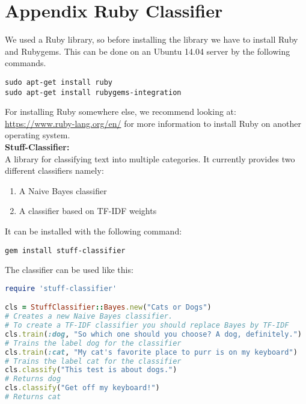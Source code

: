 \section{Appendix Ruby Classifier} \label{app:classifier}

We used a Ruby library, so before installing the library we have to install Ruby and Rubygems.
This can be done on an Ubuntu 14.04 server by the following commands. 
\begin{lstlisting}[frame=single]
sudo apt-get install ruby
sudo apt-get install rubygems-integration
\end{lstlisting}
For installing Ruby somewhere else, we recommend looking at: \url{ https://www.ruby-lang.org/en/} for more information to install Ruby on another operating system. \\
\textbf{Stuff-Classifier:} \\
A library for classifying text into multiple categories.
It currently provides two different classifiers namely: 
\begin{enumerate}
\item A Naive Bayes classifier
\item A classifier based on TF-IDF weights
\end{enumerate}
It can be installed with the following command: 
\begin{lstlisting}[frame=single]
gem install stuff-classifier
\end{lstlisting}
The classifier can be used like this:

\begin{lstlisting}[language=Ruby]
require 'stuff-classifier'

cls = StuffClassifier::Bayes.new("Cats or Dogs")
# Creates a new Naive Bayes classifier.
# To create a TF-IDF classifier you should replace Bayes by TF-IDF
cls.train(:dog, "So which one should you choose? A dog, definitely.")
# Trains the label dog for the classifier
cls.train(:cat, "My cat's favorite place to purr is on my keyboard")
# Trains the label cat for the classifier
cls.classify("This test is about dogs.") 
# Returns dog
cls.classify("Get off my keyboard!") 
# Returns cat

\end{lstlisting}


\clearpage